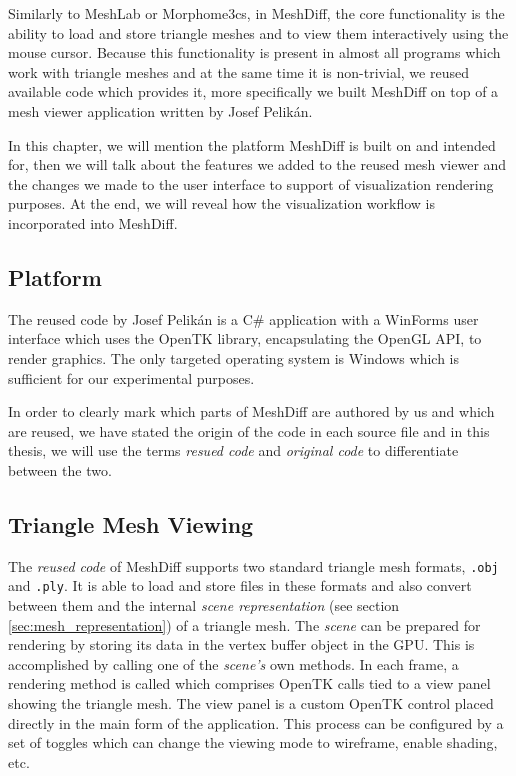 Similarly to MeshLab or Morphome3cs, in MeshDiff, the core functionality is the ability to load and store triangle meshes and to view them interactively using the mouse cursor. Because this functionality is present in almost all programs which work with triangle meshes and at the same time it is non-trivial, we reused available code which provides it, more specifically we built MeshDiff on top of a mesh viewer application written by Josef Pelikán.

In this chapter, we will mention the platform MeshDiff is built on and intended for, then we will talk about the features we added to the reused mesh viewer and the changes we made to the user interface to support of visualization rendering purposes. At the end, we will reveal how the visualization workflow is incorporated into MeshDiff.

\subsection{Platform}

The reused code by Josef Pelikán is a C\# application with a WinForms user interface which uses the OpenTK library, encapsulating the OpenGL API, to render graphics. The only targeted operating system is Windows which is sufficient for our experimental purposes.

In order to clearly mark which parts of MeshDiff are authored by us and which are reused, we have stated the origin of the code in each source file and in this thesis, we will use the terms {\it resued code} and {\it original code} to differentiate between the two.

\subsection{Triangle Mesh Viewing}

The {\it reused code} of MeshDiff supports two standard triangle mesh formats, \verb+.obj+ and \verb+.ply+. It is able to load and store files in these formats and also convert between them and the internal {\it scene representation} (see section \ref{sec:mesh_representation}) of a triangle mesh. The {\it scene} can be prepared for rendering by storing its data in the vertex buffer object in the GPU. This is accomplished by calling one of the {\it scene's} own methods. In each frame, a rendering method is called which comprises OpenTK calls tied to a view panel showing the triangle mesh. The view panel is a custom OpenTK control placed directly in the main form of the application. This process can be configured by a set of toggles which can change the viewing mode to wireframe, enable shading, etc.

